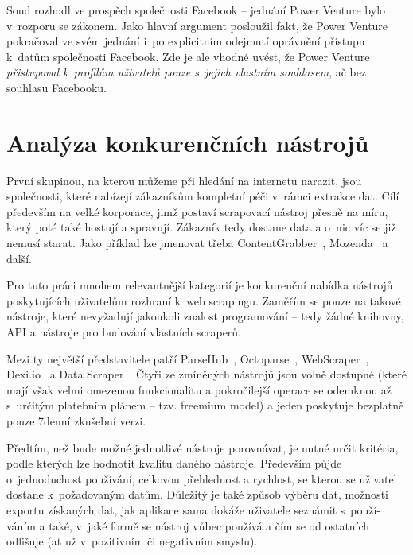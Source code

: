\documentclass[thesis=B,czech]{FITthesis}[2012/06/26]
\begin{document}
Soud rozhodl ve prospěch společnosti Facebook -- jednání Power Venture bylo v~rozporu se zákonem. Jako hlavní argument posloužil fakt, že Power Venture pokračoval ve svém jednání i~po explicitním odejmutí oprávnění přístupu k~datům společnosti Facebook. Zde je ale vhodné uvést, že Power Venture \emph{přistupoval k~profilům uživatelů pouze s~jejich vlastním souhlasem}, ač bez souhlasu Facebooku.~\cite{facebook_venture_2}


\newpage
\section{Analýza konkurenčních nástrojů}
První skupinou, na kterou můžeme při hledání na internetu narazit, jsou společnosti, které nabízejí zákazníkům kompletní péči v~rámci extrakce dat. Cílí především na velké korporace, jimž postaví scrapovací nástroj přesně na míru, který poté také hostují a spravují. Zákazník tedy dostane data a o~nic víc se již nemusí starat. Jako příklad lze jmenovat třeba ContentGrabber~\cite{content_grabber}, Mozenda~\cite{mozenda} a další.

Pro tuto práci mnohem relevantnější kategorií je konkurenční nabídka nástrojů poskytujících uživatelům rozhraní k~web scrapingu. Zaměřím se pouze na takové nástroje, které nevyžadují jakoukoli znalost programování -- tedy žádné knihovny, API a nástroje pro budování vlastních scraperů.

Mezi ty největší představitele patří ParseHub~\cite{parsehub}, Octoparse~\cite{octoparse}, WebScraper~\cite{webscraper}, Dexi.io~\cite{dexio} a Data Scraper~\cite{data_scraper}. Čtyři ze zmíněných nástrojů jsou volně dostupné (které mají však velmi omezenou funkcionalitu a pokročilejší operace se odemknou až s~určitým platebním plánem -- tzv. freemium model) a jeden poskytuje bezplatně pouze 7denní zkušební verzi.

Předtím, než bude možné jednotlivé nástroje porovnávat, je nutné určit kritéria, podle kterých lze hodnotit kvalitu daného nástroje. Především půjde o~jednoduchost používání, celkovou přehlednost a rychlost, se kterou se uživatel dostane k~požadovaným datům. Důležitý je také způsob výběru dat, možnosti exportu získaných dat, jak aplikace sama dokáže uživatele seznámit s~použí-váním a také, v~jaké formě se nástroj vůbec používá a čím se od ostatních odlišuje (ať už v~pozitivním či negativním smyslu). 
\end{document}
